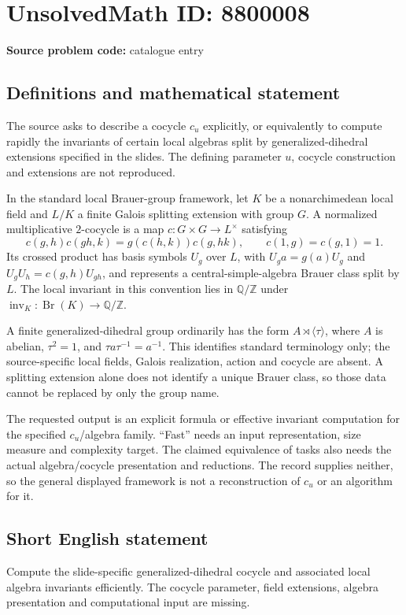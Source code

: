\documentclass[11pt]{article}
\newcommand{\Z}{\mathbb{Z}}
\newcommand{\Q}{\mathbb{Q}}
\begin{document}
\section*{UnsolvedMath ID: 8800008}
\textbf{Source problem code:} catalogue entry
\subsection{Definitions and mathematical statement}
The source asks to describe a cocycle $c_u$ explicitly, or equivalently to compute rapidly the invariants of certain local algebras split by generalized-dihedral extensions specified in the slides. The defining parameter $u$, cocycle construction and extensions are not reproduced.

In the standard local Brauer-group framework, let $K$ be a nonarchimedean local field and $L/K$ a finite Galois splitting extension with group $G$. A normalized multiplicative $2$-cocycle is a map $c:G\times G\to L^\times$ satisfying
\[
c(g,h)c(gh,k)=g(c(h,k))c(g,hk),\qquad c(1,g)=c(g,1)=1.
\]
Its crossed product has basis symbols $U_g$ over $L$, with $U_ga=g(a)U_g$ and $U_gU_h=c(g,h)U_{gh}$, and represents a central-simple-algebra Brauer class split by $L$. The local invariant in this convention lies in $\Q/\Z$ under $\operatorname{inv}_K:\operatorname{Br}(K)\to\Q/\Z$.

A finite generalized-dihedral group ordinarily has the form $A\rtimes\langle\tau\rangle$, where $A$ is abelian, $\tau^2=1$, and $\tau a\tau^{-1}=a^{-1}$. This identifies standard terminology only; the source-specific local fields, Galois realization, action and cocycle are absent. A splitting extension alone does not identify a unique Brauer class, so those data cannot be replaced by only the group name.

The requested output is an explicit formula or effective invariant computation for the specified $c_u$/algebra family. ``Fast'' needs an input representation, size measure and complexity target. The claimed equivalence of tasks also needs the actual algebra/cocycle presentation and reductions. The record supplies neither, so the general displayed framework is not a reconstruction of $c_u$ or an algorithm for it.
\subsection{Short English statement}
Compute the slide-specific generalized-dihedral cocycle and associated local algebra invariants efficiently. The cocycle parameter, field extensions, algebra presentation and computational input are missing.
\end{document}
